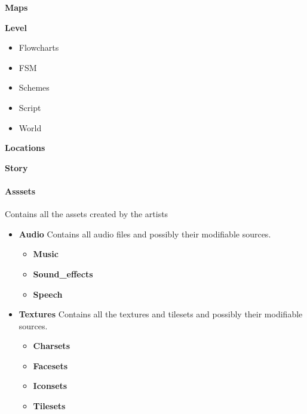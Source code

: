 \begin{itemize}[noitemsep, nolistsep, label={-}]
\begin{itemize}[noitemsep, nolistsep, label={-}]
\begin{multicols}{2}
			\columnbreak
				
				\item \textbf{Maps}
				\item \textbf{Level}
					\begin{itemize}[noitemsep, nolistsep, label={-}]
						\item Flowcharts
						\item FSM
						\item Schemes
						\item Script
						\item World
					\end{itemize}
					
				\item \textbf{Locations}
				\item \textbf{Story}
				
			\end{multicols}
		
		\end{itemize}
\end{itemize}

\paragraph{Asssets} Contains all the assets created by the artists

\begin{itemize}[noitemsep, nolistsep, label={-}]
	\item \textbf{Audio} Contains all audio files and possibly their modifiable sources.
		\begin{itemize}[noitemsep, nolistsep, label={-}]
			\item \textbf{Music}
			\item \textbf{Sound\_effects}
			\item \textbf{Speech}
		\end{itemize}
	
	\item \textbf{Textures} Contains all the textures and tilesets and possibly their modifiable sources.
		\begin{itemize}[noitemsep, nolistsep, label={-}]
			\item \textbf{Charsets}
			\item \textbf{Facesets}
			\item \textbf{Iconsets}
			\item \textbf{Tilesets}
		\end{itemize}
\end{itemize}

